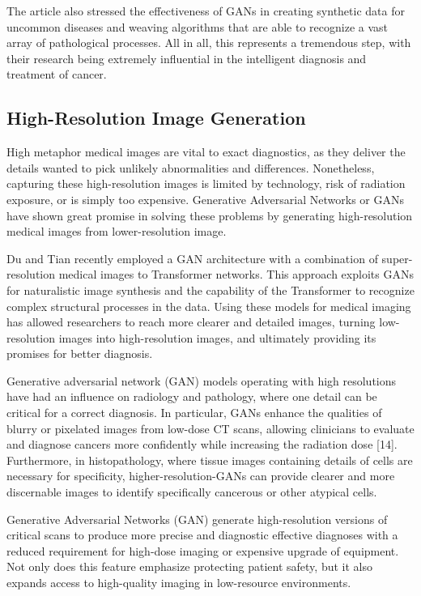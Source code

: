 \documentclass[12pt]{article}
\begin{document}
The article also stressed the effectiveness of GANs in creating synthetic data for uncommon diseases and weaving algorithms that are able to recognize a vast array of pathological processes. All in all, this represents a tremendous step, with their research being extremely influential in the intelligent diagnosis and treatment of cancer.


\subsection{High-Resolution Image Generation}

High metaphor medical images are vital to exact diagnostics, as they deliver the details wanted to pick unlikely abnormalities and differences. Nonetheless, capturing these high-resolution images is limited by technology, risk of radiation exposure, or is simply too expensive. Generative Adversarial Networks or GANs have shown great promise in solving these problems by generating high-resolution medical images from lower-resolution image.

Du and Tian \cite{Du2024} recently employed a GAN architecture with a combination of super-resolution medical images to Transformer networks. This approach exploits GANs for naturalistic image synthesis and the capability of the Transformer to recognize complex structural processes in the data. Using these models for medical imaging has allowed researchers to reach more clearer and detailed images, turning low-resolution images into high-resolution images, and ultimately providing its promises for better diagnosis.

Generative adversarial network (GAN) models operating with high resolutions have had an influence on radiology and pathology, where one detail can be critical for a correct diagnosis. In particular, GANs enhance the qualities of blurry or pixelated images from low-dose CT scans, allowing clinicians to evaluate and diagnose cancers more confidently while increasing the radiation dose [14]. Furthermore, in histopathology, where tissue images containing details of cells are necessary for specificity, higher-resolution-GANs can provide clearer and more discernable images to identify specifically cancerous or other atypical cells.

Generative Adversarial Networks (GAN) generate high-resolution versions of critical scans to produce more precise and diagnostic effective diagnoses with a reduced requirement for high-dose imaging or expensive upgrade of equipment. Not only does this feature emphasize protecting patient safety, but it also expands access to high-quality imaging in low-resource environments.
\end{document}

